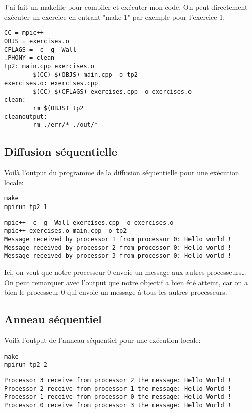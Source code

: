 \documentclass[11pt]{article}
\begin{document}
J'ai fait un makefile pour compiler et exécuter mon code. On peut directement exécuter un exercice en entrant "make 1" par exemple pour l'exercice 1.
\begin{verbatim}
CC = mpic++
OBJS = exercises.o
CFLAGS = -c -g -Wall
.PHONY = clean
tp2: main.cpp exercises.o
        $(CC) $(OBJS) main.cpp -o tp2
exercises.o: exercises.cpp
        $(CC) $(CFLAGS) exercises.cpp -o exercises.o
clean:
        rm $(OBJS) tp2
cleanoutput:
        rm ./err/* ./out/*
\end{verbatim}
\subsection{Diffusion séquentielle}
\label{sec:orgd364241}
Voilà l'output du programme de la diffusion séquentielle pour une exécution locale:
\begin{verbatim}
make
mpirun tp2 1
\end{verbatim}

\begin{verbatim}
mpic++ -c -g -Wall exercises.cpp -o exercises.o
mpic++ exercises.o main.cpp -o tp2
Message received by processor 1 from processor 0: Hello world !
Message received by processor 2 from processor 0: Hello world !
Message received by processor 3 from processor 0: Hello world !
\end{verbatim}


Ici, on veut que notre processeur 0 envoie un message aux autres processeurs\ldots{} On peut remarquer avec l'output que notre objectif a bien été atteint,
car on a bien le processeur 0 qui envoie un message à tous les autres processeurs.

\subsection{Anneau séquentiel}
\label{sec:org8f09515}

Voilà l'output de l'anneau séquentiel pour une exécution locale:

\begin{verbatim}
make
mpirun tp2 2
\end{verbatim}

\begin{verbatim}
Processor 3 receive from processor 2 the message: Hello World !
Processor 2 receive from processor 1 the message: Hello World !
Processor 1 receive from processor 0 the message: Hello World !
Processor 0 receive from processor 3 the message: Hello World !
\end{verbatim}
\end{document}
